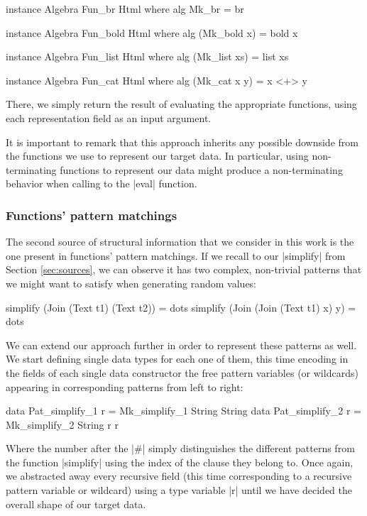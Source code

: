 \begin{code}
instance Algebra Fun_br Html where
  alg Mk_br = br

instance Algebra Fun_bold Html where
  alg (Mk_bold x) = bold x

instance Algebra Fun_list Html where
  alg (Mk_list xs) = list xs

instance Algebra Fun_cat Html where
  alg (Mk_cat x y) = x <+> y
\end{code}
%
There, we simply return the result of evaluating the appropriate functions,
using each representation field as an input argument.


It is important to remark that this approach inherits any possible downside from
the functions we use to represent our target data.
%
In particular, using non-terminating functions to represent our data might
produce a non-terminating behavior when calling to the |eval| function.


%
%
\subsubsection{Functions' pattern matchings}

The second source of structural information that we consider in this work is the
one present in functions' pattern matchings.
%
If we recall to our |simplify| from Section \ref{sec:sources}, we can observe it
has two complex, non-trivial patterns that we might want to satisfy when
generating random values:

\begin{code}
simplify (Join (Text t1) (Text t2))   = dots
simplify (Join (Join (Text t1) x) y)  = dots
\end{code}

We can extend our approach further in order to represent these patterns as well.
%
We start defining single data types for each one of them, this time encoding in
the fields of each single data constructor the free pattern variables (or
wildcards) appearing in corresponding patterns from left to right:

\begin{code}
data Pat_simplify_1 r = Mk_simplify_1 String String
data Pat_simplify_2 r = Mk_simplify_2 String r r
\end{code}
%
Where the number after the |#| simply distinguishes the different patterns from
the function |simplify| using the index of the clause they belong to.
%
Once again, we abstracted away every recursive field (this time corresponding to
a recursive pattern variable or wildcard) using a type variable |r| until we
have decided the overall shape of our target data.


